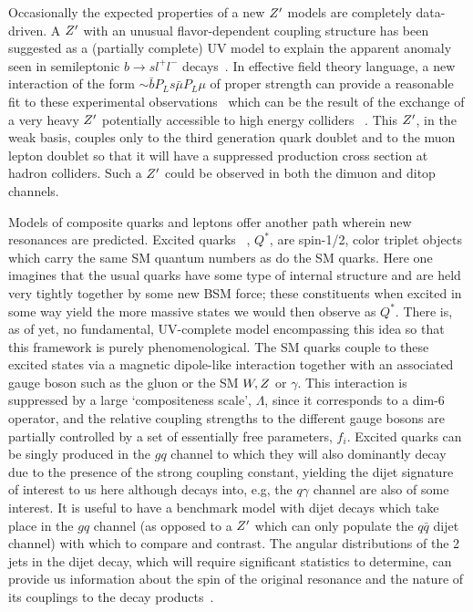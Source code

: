 Occasionally the expected properties of a new $Z^{\prime}$ models are completely data-driven.  A $Z^{\prime}$ with an unusual flavor-dependent coupling structure has been suggested as 
a (partially complete) UV model to explain the apparent anomaly seen in semileptonic $b\rightarrow sl^+l^-$ decays~\cite{Aaij:2014ora,Aaij:2017vbb}. In effective field theory language, 
a new interaction of the form $\sim \bar bP_Ls \bar \mu P_L \mu$ of proper strength can provide a reasonable fit to these experimental observations~\cite{Bifani:2018zmi} which can 
be the result of the exchange of a 
very heavy $Z^{\prime}$ potentially accessible to high energy colliders ~\cite{Allanach:2017bta}. This $Z^{\prime}$, in the weak basis, couples only to the third generation quark doublet and to the 
muon lepton doublet so that it will have a suppressed production cross section at hadron colliders. Such a $Z^{\prime}$ could be observed in both the dimuon and ditop channels.

Models of composite quarks and leptons offer another path wherein new resonances are predicted. Excited quarks ~\cite{Baur:1987ga,Baur:1989kv}, $Q^*$, are spin-1/2, color triplet 
objects which carry the same SM quantum numbers as do the SM quarks. Here one imagines that the usual quarks have some type of internal structure and are held very tightly together 
by some new BSM force; these constituents when excited in some way yield the more massive states we would then observe as $Q^*$. There is, as of yet, no fundamental, UV-complete 
model encompassing this idea so that this framework is purely phenomenological. The SM quarks couple to these excited states via a magnetic dipole-like interaction together with an associated gauge boson such as the gluon or the SM $W,Z$ or $\gamma$.  This interaction is suppressed by a large `compositeness scale', $\Lambda$, since it corresponds to a dim-6 operator, and the relative coupling strengths to the different gauge bosons are partially controlled by a set of essentially free parameters, $f_i$. Excited quarks can be singly produced in 
the $gq$ channel to which they will also dominantly decay due to the presence of the strong coupling constant, yielding the dijet signature of interest to us here although decays into, e.g, 
the $q\gamma$ channel are also of some interest. It is useful to have a benchmark model with dijet decays which take place in the $gq$ channel (as opposed to a $Z^{\prime}$ which can 
only populate the $q\bar q$ dijet channel) with which to compare and contrast. The angular distributions of the 2 jets in the dijet decay, which will require significant statistics to 
determine, can provide 
us information about the spin of the original resonance and the nature of its couplings to the decay products~\cite{Harris:2011bh,Boelaert:2009jm,Chivukula:2014pma,Chivukula:2017nvl}. 

